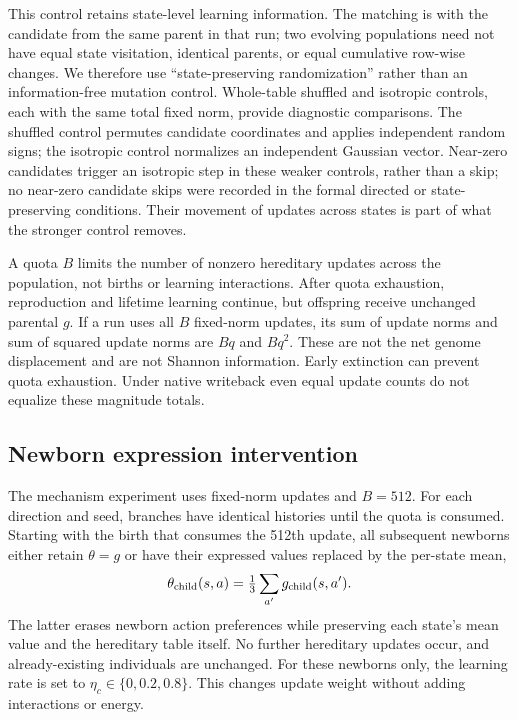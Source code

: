 \documentclass[11pt]{article}
\begin{document}
This control retains state-level learning information. The matching is with the candidate from the same parent in that run; two evolving populations need not have equal state visitation, identical parents, or equal cumulative row-wise changes. We therefore use ``state-preserving randomization'' rather than an information-free mutation control. Whole-table shuffled and isotropic controls, each with the same total fixed norm, provide diagnostic comparisons. The shuffled control permutes candidate coordinates and applies independent random signs; the isotropic control normalizes an independent Gaussian vector. Near-zero candidates trigger an isotropic step in these weaker controls, rather than a skip; no near-zero candidate skips were recorded in the formal directed or state-preserving conditions. Their movement of updates across states is part of what the stronger control removes.

A quota $B$ limits the number of nonzero hereditary updates across the population, not births or learning interactions. After quota exhaustion, reproduction and lifetime learning continue, but offspring receive unchanged parental $g$. If a run uses all $B$ fixed-norm updates, its sum of update norms and sum of squared update norms are $Bq$ and $Bq^2$. These are not the net genome displacement and are not Shannon information. Early extinction can prevent quota exhaustion. Under native writeback even equal update counts do not equalize these magnitude totals.

\subsection{Newborn expression intervention}
The mechanism experiment uses fixed-norm updates and $B=512$. For each direction and seed, branches have identical histories until the quota is consumed. Starting with the birth that consumes the 512th update, all subsequent newborns either retain $\theta=g$ or have their expressed values replaced by the per-state mean,
\begin{equation}
\theta_{\rm child}(s,a)=\tfrac13\sum_{a'}g_{\rm child}(s,a').
\end{equation}
The latter erases newborn action preferences while preserving each state's mean value and the hereditary table itself. No further hereditary updates occur, and already-existing individuals are unchanged. For these newborns only, the learning rate is set to $\eta_c\in\{0,0.2,0.8\}$. This changes update weight without adding interactions or energy.
\end{document}
